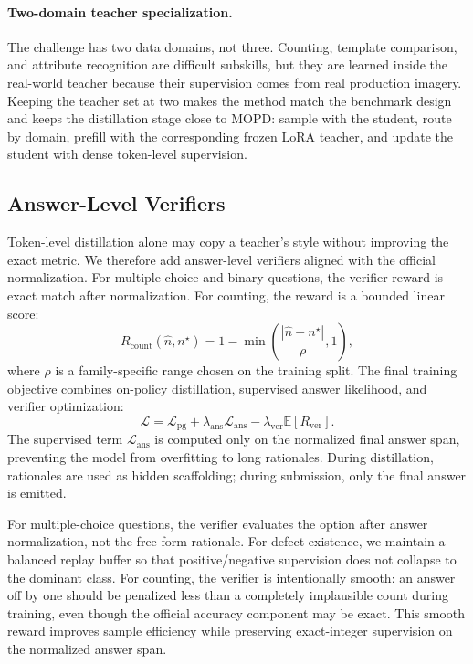 \documentclass[sigconf, screen, review, anonymous]{acmart}
\begin{document}
\paragraph{Two-domain teacher specialization.}
The challenge has two data domains, not three. Counting, template comparison, and attribute recognition are difficult subskills, but they are learned inside the real-world teacher because their supervision comes from real production imagery. Keeping the teacher set at two makes the method match the benchmark design and keeps the distillation stage close to MOPD: sample with the student, route by domain, prefill with the corresponding frozen LoRA teacher, and update the student with dense token-level supervision.

\subsection{Answer-Level Verifiers}
\label{subsec:verifiers}

Token-level distillation alone may copy a teacher's style without improving the exact metric. We therefore add answer-level verifiers aligned with the official normalization. For multiple-choice and binary questions, the verifier reward is exact match after normalization. For counting, the reward is a bounded linear score:
\begin{equation}
R_{\mathrm{count}}(\hat{n},n^\star)=
1-\min\left(\frac{|\hat{n}-n^\star|}{\rho},1\right),
\label{eq:count_reward}
\end{equation}
where $\rho$ is a family-specific range chosen on the training split. The final training objective combines on-policy distillation, supervised answer likelihood, and verifier optimization:
\begin{equation}
\mathcal{L} =
\mathcal{L}_{\mathrm{pg}}
+\lambda_{\mathrm{ans}}\mathcal{L}_{\mathrm{ans}}
-\lambda_{\mathrm{ver}}\mathbb{E}[R_{\mathrm{ver}}].
\label{eq:final_loss}
\end{equation}
The supervised term $\mathcal{L}_{\mathrm{ans}}$ is computed only on the normalized final answer span, preventing the model from overfitting to long rationales. During distillation, rationales are used as hidden scaffolding; during submission, only the final answer is emitted.

For multiple-choice questions, the verifier evaluates the option after answer normalization, not the free-form rationale. For defect existence, we maintain a balanced replay buffer so that positive/negative supervision does not collapse to the dominant class. For counting, the verifier is intentionally smooth: an answer off by one should be penalized less than a completely implausible count during training, even though the official accuracy component may be exact. This smooth reward improves sample efficiency while preserving exact-integer supervision on the normalized answer span.
\end{document}
